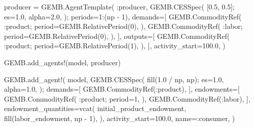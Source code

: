 \documentclass[
  letterpaper,
  DIV=11,
  numbers=noendperiod]{scrreprt}
\newenvironment{Shaded}{\begin{snugshade}}{\end{snugshade}}
\newcommand{\FloatTok}[1]{\textcolor[rgb]{0.68,0.00,0.00}{#1}}
\newcommand{\FunctionTok}[1]{\textcolor[rgb]{0.28,0.35,0.67}{#1}}
\newcommand{\NormalTok}[1]{\textcolor[rgb]{0.00,0.23,0.31}{#1}}
\newcommand{\OperatorTok}[1]{\textcolor[rgb]{0.37,0.37,0.37}{#1}}
\begin{document}
\begin{codelisting}
{\begin{Shaded}
\begin{Highlighting}[]
\NormalTok{producer }\OperatorTok{=}\NormalTok{ GEMB.}\FunctionTok{AgentTemplate}\NormalTok{(}
    \OperatorTok{:}\NormalTok{producer,}
\NormalTok{    GEMB.}\FunctionTok{CESSpec}\NormalTok{(}
\NormalTok{        [}\FloatTok{0.5}\NormalTok{, }\FloatTok{0.5}\NormalTok{];}
\NormalTok{        es}\OperatorTok{=}\FloatTok{1.0}\NormalTok{,}
\NormalTok{        alpha}\OperatorTok{=}\FloatTok{2.0}\NormalTok{,}
\NormalTok{    );}
\NormalTok{    periods}\OperatorTok{=}\FloatTok{1}\OperatorTok{:}\NormalTok{(np }\OperatorTok{{-}} \FloatTok{1}\NormalTok{),}
\NormalTok{    demands}\OperatorTok{=}\NormalTok{[}
\NormalTok{        GEMB.}\FunctionTok{CommodityRef}\NormalTok{(}
            \OperatorTok{:}\NormalTok{product;}
\NormalTok{            period}\OperatorTok{=}\NormalTok{GEMB.}\FunctionTok{RelativePeriod}\NormalTok{(}\FloatTok{0}\NormalTok{),}
\NormalTok{        ),}
\NormalTok{        GEMB.}\FunctionTok{CommodityRef}\NormalTok{(}
            \OperatorTok{:}\NormalTok{labor;}
\NormalTok{            period}\OperatorTok{=}\NormalTok{GEMB.}\FunctionTok{RelativePeriod}\NormalTok{(}\FloatTok{0}\NormalTok{),}
\NormalTok{        ),}
\NormalTok{    ],}
\NormalTok{    outputs}\OperatorTok{=}\NormalTok{[}
\NormalTok{        GEMB.}\FunctionTok{CommodityRef}\NormalTok{(}
            \OperatorTok{:}\NormalTok{product;}
\NormalTok{            period}\OperatorTok{=}\NormalTok{GEMB.}\FunctionTok{RelativePeriod}\NormalTok{(}\FloatTok{1}\NormalTok{),}
\NormalTok{        ),}
\NormalTok{    ],}
\NormalTok{    activity\_start}\OperatorTok{=}\FloatTok{100.0}\NormalTok{,}
\NormalTok{)}

\NormalTok{GEMB.}\FunctionTok{add\_agents!}\NormalTok{(model, producer)}

\NormalTok{GEMB.}\FunctionTok{add\_agent!}\NormalTok{(}
\NormalTok{    model,}
\NormalTok{    GEMB.}\FunctionTok{CESSpec}\NormalTok{(}
        \FunctionTok{fill}\NormalTok{(}\FloatTok{1.0} \OperatorTok{/}\NormalTok{ np, np);}
\NormalTok{        es}\OperatorTok{=}\FloatTok{1.0}\NormalTok{,}
\NormalTok{        alpha}\OperatorTok{=}\FloatTok{1.0}\NormalTok{,}
\NormalTok{    );}
\NormalTok{    demands}\OperatorTok{=}\NormalTok{[}
\NormalTok{        GEMB.}\FunctionTok{CommodityRef}\NormalTok{(}\OperatorTok{:}\NormalTok{product),}
\NormalTok{    ],}
\NormalTok{    endowments}\OperatorTok{=}\NormalTok{[}
\NormalTok{        GEMB.}\FunctionTok{CommodityRef}\NormalTok{(}
            \OperatorTok{:}\NormalTok{product;}
\NormalTok{            period}\OperatorTok{=}\FloatTok{1}\NormalTok{,}
\NormalTok{        ),}
\NormalTok{        GEMB.}\FunctionTok{CommodityRef}\NormalTok{(}\OperatorTok{:}\NormalTok{labor),}
\NormalTok{    ],}
\NormalTok{    endowment\_quantities}\OperatorTok{=}\FunctionTok{vcat}\NormalTok{(}
\NormalTok{        initial\_product\_endowment,}
        \FunctionTok{fill}\NormalTok{(labor\_endowment, np }\OperatorTok{{-}} \FloatTok{1}\NormalTok{),}
\NormalTok{    ),}
\NormalTok{    activity\_start}\OperatorTok{=}\FloatTok{100.0}\NormalTok{,}
\NormalTok{    name}\OperatorTok{=:}\NormalTok{consumer,}
\NormalTok{)}


\end{Highlighting}
\end{Shaded}}
\end{codelisting}
\end{document}
